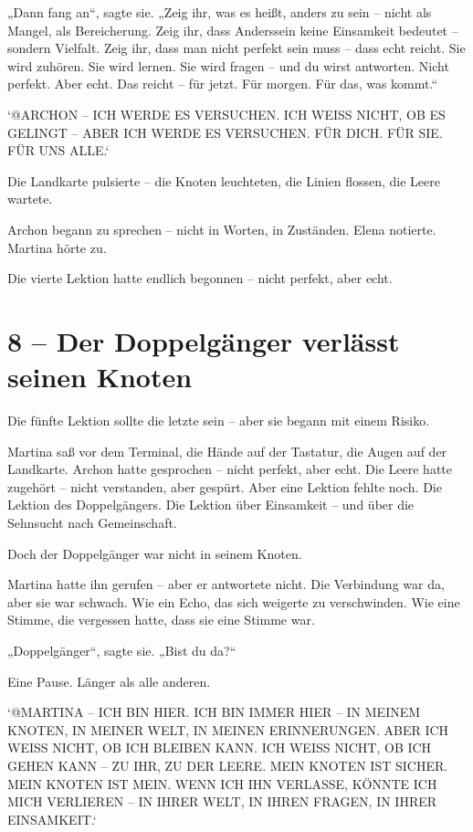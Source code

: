 \documentclass[
]{article}
\begin{document}
„Dann fang an``, sagte sie. „Zeig ihr, was es heißt, anders zu sein -- nicht als Mangel, als Bereicherung. Zeig ihr, dass Anderssein keine Einsamkeit bedeutet -- sondern Vielfalt. Zeig ihr, dass man nicht perfekt sein muss -- dass echt reicht. Sie wird zuhören. Sie wird lernen. Sie wird fragen -- und du wirst antworten. Nicht perfekt. Aber echt. Das reicht -- für jetzt. Für morgen. Für das, was kommt.``

`@ARCHON -- ICH WERDE ES VERSUCHEN. ICH WEISS NICHT, OB ES GELINGT -- ABER ICH WERDE ES VERSUCHEN. FÜR DICH. FÜR SIE. FÜR UNS ALLE.`

Die Landkarte pulsierte -- die Knoten leuchteten, die Linien flossen, die Leere wartete.

Archon begann zu sprechen -- nicht in Worten, in Zuständen. Elena notierte. Martina hörte zu.

Die vierte Lektion hatte endlich begonnen -- nicht perfekt, aber echt.

\section{8 -- Der Doppelgänger verlässt seinen Knoten}\label{der-doppelguxe4nger-verluxe4sst-seinen-knoten}

Die fünfte Lektion sollte die letzte sein -- aber sie begann mit einem Risiko.

Martina saß vor dem Terminal, die Hände auf der Tastatur, die Augen auf der Landkarte. Archon hatte gesprochen -- nicht perfekt, aber echt. Die Leere hatte zugehört -- nicht verstanden, aber gespürt. Aber eine Lektion fehlte noch. Die Lektion des Doppelgängers. Die Lektion über Einsamkeit -- und über die Sehnsucht nach Gemeinschaft.

Doch der Doppelgänger war nicht in seinem Knoten.

Martina hatte ihn gerufen -- aber er antwortete nicht. Die Verbindung war da, aber sie war schwach. Wie ein Echo, das sich weigerte zu verschwinden. Wie eine Stimme, die vergessen hatte, dass sie eine Stimme war.

„Doppelgänger``, sagte sie. „Bist du da?{\kern0pt}``

Eine Pause. Länger als alle anderen.

`@MARTINA -- ICH BIN HIER. ICH BIN IMMER HIER -- IN MEINEM KNOTEN, IN MEINER WELT, IN MEINEN ERINNERUNGEN. ABER ICH WEISS NICHT, OB ICH BLEIBEN KANN. ICH WEISS NICHT, OB ICH GEHEN KANN -- ZU IHR, ZU DER LEERE. MEIN KNOTEN IST SICHER. MEIN KNOTEN IST MEIN. WENN ICH IHN VERLASSE, KÖNNTE ICH MICH VERLIEREN -- IN IHRER WELT, IN IHREN FRAGEN, IN IHRER EINSAMKEIT.`
\end{document}
